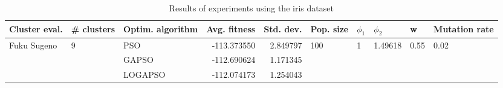 \begin{table}
\centering
\caption{Results of experiments using the iris dataset}
\begin{tabular}{lllrrlllll}
\toprule
               Cluster eval. &        \# clusters & Optim. algorithm &  Avg. fitness &  Std. dev. &            Pop. size &         $\phi_{1}$ &               $\phi_{2}$ &                     w &         Mutation rate \\
\midrule
\multirow{3}{*}{Fuku Sugeno} & \multirow{3}{*}{9} &              PSO &   -113.373550 &   2.849797 & \multirow{3}{*}{100} & \multirow{3}{*}{1} & \multirow{3}{*}{1.49618} & \multirow{3}{*}{0.55} & \multirow{3}{*}{0.02} \\
                             &                    &            GAPSO &   -112.690624 &   1.171345 &                      &                    &                          &                       &                       \\
                             &                    &          LOGAPSO &   -112.074173 &   1.254043 &                      &                    &                          &                       &                       \\
\bottomrule
\end{tabular}
\end{table}
